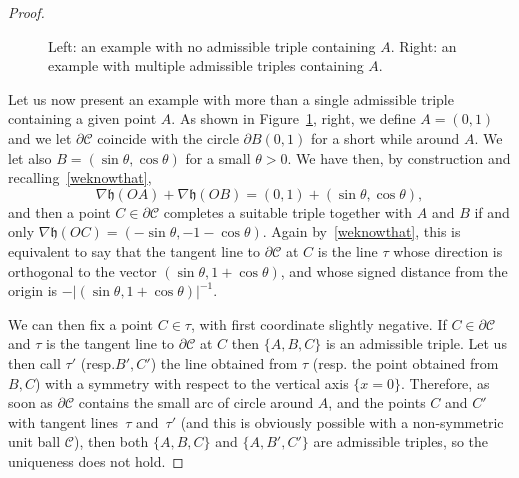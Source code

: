 \documentclass[11pt]{article}
\newcommand{\resp}{resp.\xspace}
\numberwithin{equation}{section}
\newcommand\C{\mathcal{C}}
\newcommand\h{\mathfrak h}
\theoremstyle{plain}
\theoremstyle{definition}
\begin{document}
\begin{proof}
\begin{figure}[htbp]
\caption{Left: an example with no admissible triple containing $A$. Right: an example with multiple admissible triples containing $A$.}\label{Fignonsymm}
\end{figure}
Let us now present an example with more than a single admissible triple containing a given point $A$. As shown in Figure~\ref{Fignonsymm}, right, we define $A=(0,1)$ and we let $\partial\C$ coincide with the circle $\partial B(0,1)$ for a short while around $A$. We let also $B=(\sin\theta,\cos\theta)$ for a small $\theta>0$. We have then, by construction and recalling~\eqref{weknowthat},
\[
\nabla \h(OA)+\nabla\h(OB)=(0,1) + (\sin\theta,\cos\theta),
\]
and then a point $C\in\partial\C$ completes a suitable triple together with $A$ and $B$ if and only $\nabla\h(OC)=(-\sin\theta,-1-\cos\theta)$. Again by~\eqref{weknowthat}, this is equivalent to say that the tangent line to $\partial\C$ at $C$ is the line $\tau$ whose direction is orthogonal to the vector $(\sin\theta,1+\cos\theta)$, and whose signed distance from the origin is $-\big|(\sin\theta,1+\cos\theta)\big|^{-1}$.\par
We can then fix a point $C\in \tau$, with first coordinate slightly negative. If $C\in\partial\C$ and $\tau$ is the tangent line to $\partial\C$ at $C$ then $\{A,B,C\}$ is an admissible triple. Let us then call $\tau'$ (\resp $B',C'$) the line obtained from $\tau$ (\resp the point obtained from $B,C$) with a symmetry with respect to the vertical axis $\{x=0\}$. Therefore, as soon as $\partial\C$ contains the small arc of circle around $A$, and the points $C$ and $C'$ with tangent lines~$\tau$ and~$\tau'$ (and this is obviously possible with a non-symmetric unit ball $\C$), then both $\{A,B,C\}$ and $\{A,B',C'\}$ are admissible triples, so the uniqueness does not hold.
\end{proof}
\end{document}
